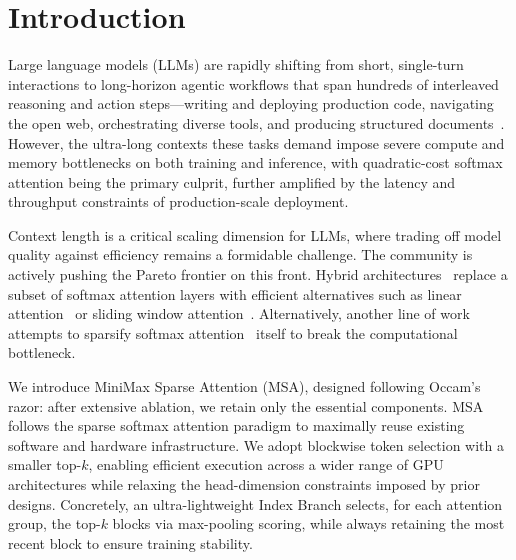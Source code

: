 \section{Introduction}
\label{sec:introduction}

Large language models (LLMs) are rapidly shifting from short, single-turn interactions to long-horizon agentic workflows that span hundreds of interleaved reasoning and action steps—writing and deploying production code, navigating the open web, orchestrating diverse tools, and producing structured documents~\citep{openai2025gpt5,anthropic2025claude46,google2025gemini31,deepseekai2026v4,moonshot2026kimi26,zhipu2026glm51}. However, the ultra-long contexts these tasks demand impose severe compute and memory bottlenecks on both training and inference, with quadratic-cost softmax attention being the primary culprit, further amplified by the latency and throughput constraints of production-scale deployment.

Context length is a critical scaling dimension for LLMs, where trading off model quality against efficiency remains a formidable challenge. The community is actively pushing the Pareto frontier on this front. Hybrid architectures~\citep{minimaxm1,qwen35blog} replace a subset of softmax attention layers with efficient alternatives such as linear attention~\citep{kimiteam2025kimilinearexpressiveefficient,yang2025gateddeltanetworksimproving,gu2023mamba} or sliding window attention~\citep{openai2025gptoss120bgptoss20bmodel,coreteam2026mimov2flashtechnicalreport}.  Alternatively, another line of work attempts to sparsify softmax attention~\citep{deepseekai2025deepseekv32pushingfrontieropen,deepseekai2026v4,minicpmteam2025minicpm4ultraefficientllmsend,lu2025mobamixtureblockattention} itself to break the computational bottleneck.

We introduce MiniMax Sparse Attention (MSA), designed following Occam's razor: after extensive ablation, we retain only the essential components. MSA follows the sparse softmax attention paradigm to maximally reuse existing software and hardware infrastructure. 
We adopt blockwise token selection with a smaller top-$k$, enabling efficient execution across a wider range of GPU architectures while relaxing the head-dimension constraints imposed by prior designs. Concretely, an ultra-lightweight Index Branch selects, for each attention group, the top-$k$ blocks via max-pooling scoring, while always retaining the most recent block to ensure training stability. 

